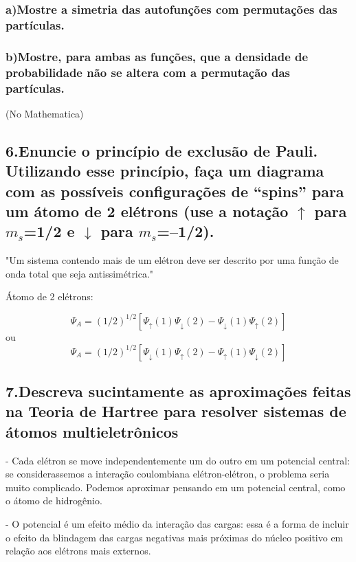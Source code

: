 \documentclass{article}
\begin{document}
\subsubsection{a)Mostre a simetria das autofunções com permutações das partículas.}

\subsubsection{b)Mostre, para ambas as funções, que a densidade de probabilidade não se altera com a permutação das partículas.}

(No Mathematica)

\subsection{6.Enuncie o princípio de exclusão de Pauli. Utilizando esse princípio, faça um diagrama com as possíveis configurações de “spins” para um átomo de 2 elétrons (use a notação $\uparrow$ para $m_s$=1/2 e $\downarrow$ para $m_s$=–1/2).}

"Um sistema contendo mais de um elétron deve ser descrito por uma função de onda total que seja antissimétrica."

Átomo de 2 elétrons: 

\begin{equation}
\Psi_A= (1/2)^{1/2}[\Psi_{\uparrow}(1)\Psi_{\downarrow}(2) -\Psi_{\downarrow}(1)\Psi_{\uparrow}(2)]
\end{equation}
ou
\begin{equation}
\Psi_A= (1/2)^{1/2}[\Psi_{\downarrow}(1)\Psi_{\uparrow}(2) -\Psi_{\uparrow}(1)\Psi_{\downarrow}(2)]
\end{equation}


\subsection{7.Descreva sucintamente as aproximações feitas na Teoria de Hartree para resolver sistemas de átomos multieletrônicos}

- Cada elétron se move independentemente um do outro em um potencial central: se considerassemos a interação coulombiana elétron-elétron, o problema seria muito complicado. Podemos aproximar pensando em um potencial central, como o átomo de hidrogênio.

- O potencial é um efeito médio da interação das cargas: essa é a forma de incluir o efeito da blindagem das cargas negativas mais próximas do núcleo positivo em relação aos elétrons mais externos.
\end{document}
